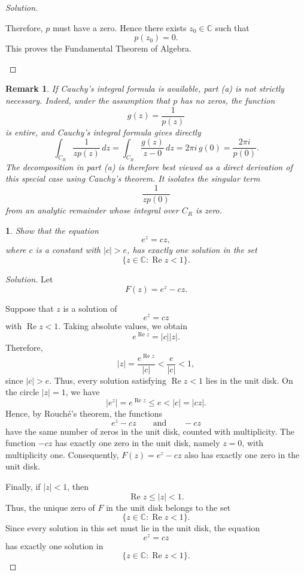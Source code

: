 \documentclass[12pt, a4paper]{report}
\theoremstyle{spaced}
\newtheorem{remark}{Remark}[section]
\newtheorem{exercise}{}
\begin{document}
\begin{proof}[Solution]
\begin{enumerate}
			Therefore, \(p\) must have a zero. Hence there exists
			\(z_0\in\mathbb{C}\) such that
			\[
				p(z_0)=0.
			\]
			This proves the Fundamental Theorem of Algebra.
	\end{enumerate}
\end{proof}
\begin{remark}
	If Cauchy's integral formula is available, part \textup{(a)} is not
	strictly necessary. Indeed, under the assumption that \(p\) has no
	zeros, the function
	\[
		g(z)=\frac{1}{p(z)}
	\]
	is entire, and Cauchy's integral formula gives directly
	\[
		\int_{C_R}\frac{1}{zp(z)}\,dz
		=
		\int_{C_R}\frac{g(z)}{z-0}\,dz
		=
		2\pi i\,g(0)
		=
		\frac{2\pi i}{p(0)}.
	\]
	The decomposition in part \textup{(a)} is therefore best viewed as a
	direct derivation of this special case using Cauchy's theorem. It
	isolates the singular term
	\[
		\frac{1}{zp(0)}
	\]
	from an analytic remainder whose integral over \(C_R\) is zero.
\end{remark}

\begin{exercise}
	Show that the equation
	\[
		e^z=cz,
	\]
	where \(c\) is a constant with \(|c|>e\), has exactly one solution in the set
	\[
		\{z\in\mathbb{C}:\operatorname{Re}z<1\}.
	\]
\end{exercise}
\begin{proof}[Solution]
	Let
	\[
		F(z)=e^z-cz.
	\]

	Suppose that \(z\) is a solution of
	\[
		e^z=cz
	\]
	with \(\operatorname{Re}z<1\). Taking absolute values, we obtain
	\[
		e^{\operatorname{Re}z}=|c||z|.
	\]
	Therefore,
	\[
		|z|
		=\frac{e^{\operatorname{Re}z}}{|c|}
		<\frac{e}{|c|}
		<1,
	\]
	since \(|c|>e\). Thus, every solution satisfying
	\(\operatorname{Re}z<1\) lies in the unit disk.
	On the circle \(|z|=1\), we have
	\[
		|e^z|
		=e^{\operatorname{Re}z}
		\leq e
		<|c|
		=|cz|.
	\]
	Hence, by Rouch\'e's theorem, the functions
	\[
		e^z-cz
		\qquad\text{and}\qquad
		-cz
	\]
	have the same number of zeros in the unit disk, counted with
	multiplicity.
	The function \(-cz\) has exactly one zero in the unit disk, namely
	\(z=0\), with multiplicity one. Consequently, \(F(z)=e^z-cz\) also
	has exactly one zero in the unit disk.

	Finally, if \(|z|<1\), then
	\[
		\operatorname{Re}z\leq |z|<1.
	\]
	Thus, the unique zero of \(F\) in the unit disk belongs to the set
	\[
		\{z\in\mathbb{C}:\operatorname{Re}z<1\}.
	\]
	Since every solution in this set must lie in the unit disk, the equation
	\[
		e^z=cz
	\]
	has exactly one solution in
	\[
		\{z\in\mathbb{C}:\operatorname{Re}z<1\}.
	\]
\end{proof}
\end{document}
